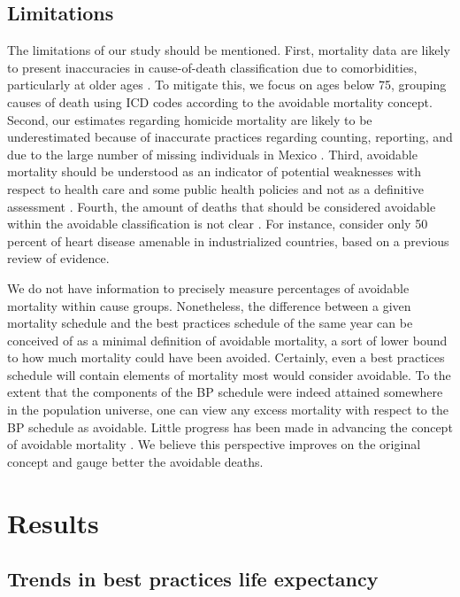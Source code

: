 \documentclass{article}
\begin{document}
\begin{spacing}{1.5}
\subsection*{Limitations}
The limitations of our study should be mentioned. First, mortality data are
likely to present inaccuracies in cause-of-death classification due to
comorbidities, particularly at older ages \citep{tobias2001}. To mitigate this,
we focus on ages below 75, grouping causes of death using ICD codes according to
the avoidable mortality concept.
Second, our estimates regarding homicide mortality are likely to be
underestimated because of inaccurate practices regarding counting, reporting,
and due to the large number of missing individuals in Mexico \citep{HRW2011}.
Third, avoidable mortality should be understood as an indicator of potential
weaknesses with respect to health care and some public health policies and not
as a definitive assessment \citep{nolte&mckee2008}. Fourth, the amount of deaths
that should be considered avoidable within the avoidable classification is not
clear \citep{beltran2011avoidable}. For instance, \citet{nolte2012amenable}
consider only 50 percent of heart disease amenable in industrialized countries,
based on a previous review of evidence.

We do not have information to precisely
measure percentages of avoidable mortality within cause groups. Nonetheless, the
difference between a given mortality schedule and the best practices schedule of
the same year can be conceived of as a minimal definition of avoidable
mortality, a sort of lower bound to how much mortality could have been avoided.
Certainly, even a best practices schedule will contain elements of mortality
most would consider avoidable. To the extent that the components of the BP schedule were indeed
attained somewhere in the population universe, one can view any excess mortality
with respect to the BP schedule as avoidable. Little progress has been made in advancing the concept of avoidable mortality \citep{holland2003}. We believe this perspective improves on the original concept and gauge better the avoidable deaths.

\section*{Results}
\subsection*{Trends in best practices life expectancy}


\end{spacing}
\end{document}
